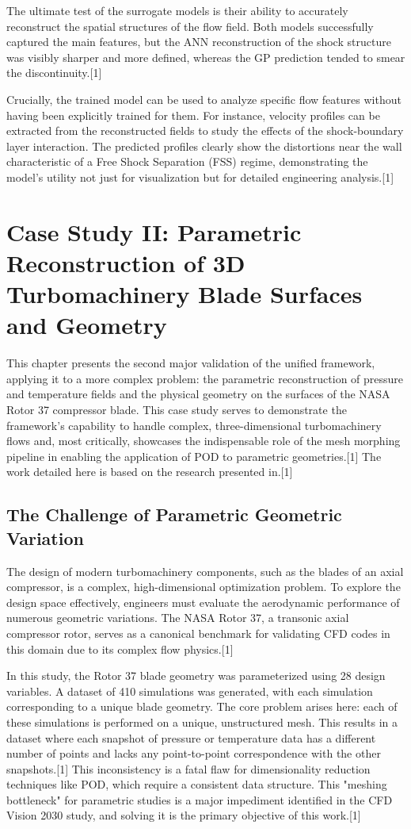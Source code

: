 \documentclass[12pt, a4paper]{report}
\begin{document}
The ultimate test of the surrogate models is their ability to accurately reconstruct the spatial structures of the flow field. Both models successfully captured the main features, but the ANN reconstruction of the shock structure was visibly sharper and more defined, whereas the GP prediction tended to smear the discontinuity.[1]

Crucially, the trained model can be used to analyze specific flow features without having been explicitly trained for them. For instance, velocity profiles can be extracted from the reconstructed fields to study the effects of the shock-boundary layer interaction. The predicted profiles clearly show the distortions near the wall characteristic of a Free Shock Separation (FSS) regime, demonstrating the model's utility not just for visualization but for detailed engineering analysis.[1]

\chapter{Case Study II: Parametric Reconstruction of 3D Turbomachinery Blade Surfaces and Geometry}

This chapter presents the second major validation of the unified framework, applying it to a more complex problem: the parametric reconstruction of pressure and temperature fields and the physical geometry on the surfaces of the NASA Rotor 37 compressor blade. This case study serves to demonstrate the framework's capability to handle complex, three-dimensional turbomachinery flows and, most critically, showcases the indispensable role of the mesh morphing pipeline in enabling the application of POD to parametric geometries.[1] The work detailed here is based on the research presented in.[1]

\section{The Challenge of Parametric Geometric Variation}

The design of modern turbomachinery components, such as the blades of an axial compressor, is a complex, high-dimensional optimization problem. To explore the design space effectively, engineers must evaluate the aerodynamic performance of numerous geometric variations. The NASA Rotor 37, a transonic axial compressor rotor, serves as a canonical benchmark for validating CFD codes in this domain due to its complex flow physics.[1]

In this study, the Rotor 37 blade geometry was parameterized using 28 design variables. A dataset of 410 simulations was generated, with each simulation corresponding to a unique blade geometry. The core problem arises here: each of these simulations is performed on a unique, unstructured mesh. This results in a dataset where each snapshot of pressure or temperature data has a different number of points and lacks any point-to-point correspondence with the other snapshots.[1] This inconsistency is a fatal flaw for dimensionality reduction techniques like POD, which require a consistent data structure. This "meshing bottleneck" for parametric studies is a major impediment identified in the CFD Vision 2030 study, and solving it is the primary objective of this work.[1]
\end{document}
